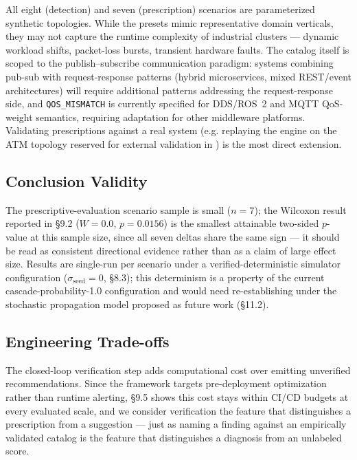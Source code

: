 \documentclass[11pt]{article}
\begin{document}
All eight (detection) and seven (prescription) scenarios are parameterized synthetic topologies. While
the presets mimic representative domain verticals, they may not capture the runtime complexity of
industrial clusters --- dynamic workload shifts, packet-loss bursts, transient hardware faults. The
catalog itself is scoped to the publish--subscribe communication paradigm: systems combining pub-sub
with request-response patterns (hybrid microservices, mixed REST/event architectures) will require
additional patterns addressing the request-response side, and \texttt{QOS\_MISMATCH} is currently
specified for DDS/ROS~2 and MQTT QoS-weight semantics, requiring adaptation for other middleware
platforms. Validating prescriptions against a real system (e.g. replaying the engine on the ATM
topology reserved for external validation in \cite{SaG}) is the most direct extension.

\subsection{Conclusion Validity}

The prescriptive-evaluation scenario sample is small ($n=7$); the Wilcoxon result reported in \S9.2
($W=0.0$, $p=0.0156$) is the smallest attainable two-sided $p$-value at this sample size, since all
seven deltas share the same sign --- it should be read as consistent directional evidence rather than
as a claim of large effect size. Results are single-run per scenario under a verified-deterministic
simulator configuration ($\sigma_{\text{seed}}=0$, \S8.3); this determinism is a property of the
current cascade-probability-1.0 configuration and would need re-establishing under the stochastic
propagation model proposed as future work (\S11.2).

\subsection{Engineering Trade-offs}

The closed-loop verification step adds computational cost over emitting unverified recommendations.
Since the framework targets pre-deployment optimization rather than runtime alerting, \S9.5 shows this
cost stays within CI/CD budgets at every evaluated scale, and we consider verification the feature
that distinguishes a prescription from a suggestion --- just as naming a finding against an empirically
validated catalog is the feature that distinguishes a diagnosis from an unlabeled score.
\end{document}
